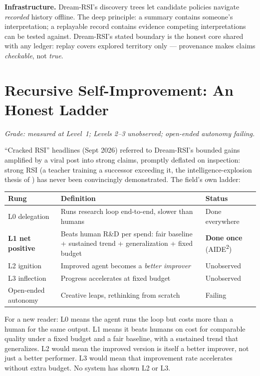 \documentclass[11pt]{article}
\begin{document}
\textbf{Infrastructure.} Dream-RSI's discovery trees let candidate policies navigate \emph{recorded} history offline. The deep principle: a summary contains someone's interpretation; a replayable record contains evidence competing interpretations can be tested against. Dream-RSI's stated boundary is the honest core shared with any ledger: replay covers explored territory only --- provenance makes claims \emph{checkable}, not \emph{true}.

\section{Recursive Self-Improvement: An Honest Ladder}
\label{sec:rsi}

\textit{Grade: measured at Level~1; Levels 2--3 unobserved; open-ended autonomy failing.}

``Cracked RSI'' headlines (Sept 2026) referred to Dream-RSI's bounded gains amplified by a viral post into strong claims, promptly deflated on inspection: strong RSI (a teacher training a successor exceeding it, the intelligence-explosion thesis of \citep{good1965}) has never been convincingly demonstrated. The field's own ladder:

\begin{center}
\small
\begin{tabular}{p{2.6cm}p{4.2cm}p{5.4cm}}
\toprule
Rung & Definition & Status \\
\midrule
L0 delegation & Runs research loop end-to-end, slower than humans & Done everywhere \\
\textbf{L1 net positive} & Beats human R\&D per spend: fair baseline + sustained trend + generalization + fixed budget & \textbf{Done once} (AIDE\textsuperscript{2}) \\
L2 ignition & Improved agent becomes a \emph{better improver} & Unobserved \\
L3 inflection & Progress accelerates at fixed budget & Unobserved \\
Open-ended autonomy & Creative leaps, rethinking from scratch & Failing \citep{kapoor2026} \\
\bottomrule
\end{tabular}
\end{center}

For a new reader: L0 means the agent runs the loop but costs more than a human for the same output. L1 means it beats humans on cost for comparable quality under a fixed budget and a fair baseline, with a sustained trend that generalizes. L2 would mean the improved version is itself a better improver, not just a better performer. L3 would mean that improvement rate accelerates without extra budget. No system has shown L2 or L3.
\end{document}
